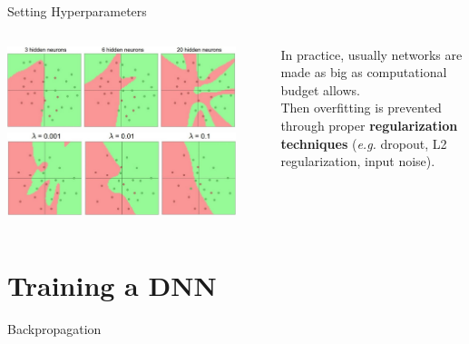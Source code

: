 \documentclass[aspectratio=169]{beamer}
\begin{document}

\begin{frame}{Setting Hyperparameters}
\begin{columns}
\begin{column}{0.6\textwidth}
\includegraphics[width=0.9\textwidth]{img/dnn/dnn_overfit.jpg}\\
\includegraphics[width=0.9\textwidth]{img/dnn/dnn_overfit_reg.jpg}
\end{column}
\begin{column}{0.4\textwidth}
In practice, usually networks are made as big as computational budget allows.\\
\vspace{0.5cm}
Then overfitting is prevented through proper \textbf{regularization techniques} (\emph{e.g.} dropout, L2 regularization, input noise).
\end{column}
\end{columns}
\end{frame}


\section{Training a DNN}



\begin{frame}{Backpropagation}

\end{frame}
\end{document}
